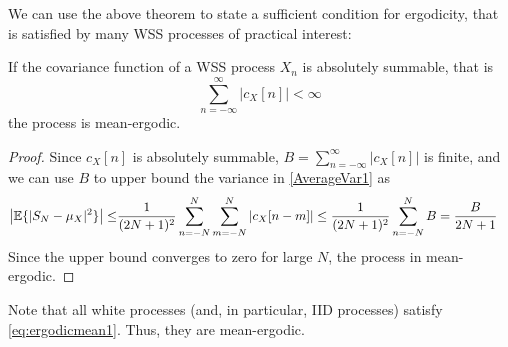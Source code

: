 We can use the above theorem to state a sufficient condition for ergodicity, that is satisfied by many WSS processes of practical interest:

\begin{theorem}

If the covariance function of a WSS process $X_n$ is absolutely summable, that is
\begin{equation}
  \label{eq:ergodicmean1}
  \sum_{n=-\infty}^{\infty} |c_X[n]| <\infty
\end{equation}
the process is mean-ergodic.

\end{theorem}

\begin{proof}

Since $c_X[n]$ is absolutely summable, $B=\sum_{n=-\infty}^{\infty} |c_X[n]|$ is finite, and we can use $B$ to upper bound the variance in \eqref{AverageVar1} as
\begin{align}
\left|\mathbb{E}\{|S_N - \mu_X|^2\} \right|
    \le & \frac{1}{(2N+1)^2} \sum_{n=-N}^N\sum_{m=-N}^N  \left|c_X[n-m]\right|
    \le   \frac{1}{(2N+1)^2} \sum_{n=-N}^N B
    =     \frac{B}{2N+1} 
\label{AverageVar2}
\end{align}
Since the upper bound converges to zero for large $N$, the process in mean-ergodic.
\end{proof}

Note that all white processes (and, in particular, IID processes) satisfy \eqref{eq:ergodicmean1}. Thus, they are mean-ergodic.


